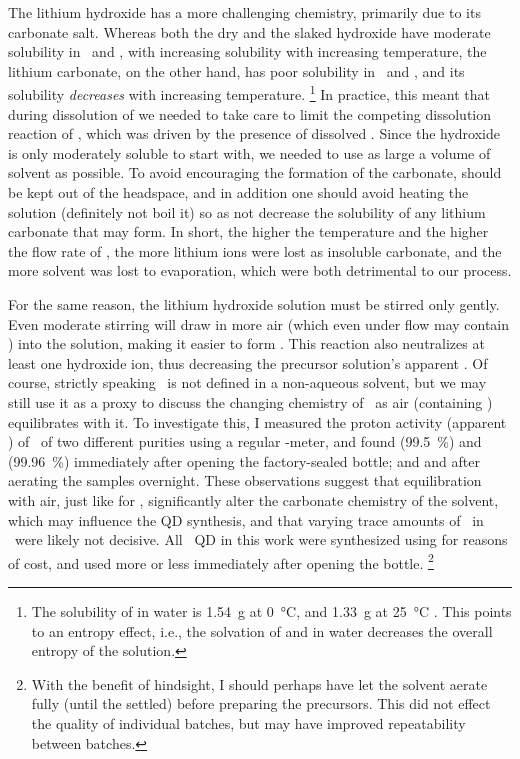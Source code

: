 \documentclass[draft,webedition,openright,titles,swedish,english]{LuaUUThesis}\usepackage[]{graphicx}\usepackage[]{xcolor}
\newcommand{\ie}{i.e.}
\begin{document}
The lithium hydroxide  has a more
challenging chemistry, primarily due to its carbonate salt.
Whereas both the dry and the slaked hydroxide have moderate solubility in \water\ and \EtOH,
with increasing solubility with increasing temperature, the
lithium carbonate, on the other hand, has poor solubility in \water\ and \EtOH,
and its solubility \emph{decreases} with increasing temperature.%
\footnote{%
   The solubility of  in water is \qty{1.54}{\gram} at \qty{0}{\celsius},
   and \qty{1.33}{\gram} at \qty{25}{\celsius} \cite{CRC104}.
   This points to an entropy effect, \ie, the solvation of  and 
   in water decreases the overall entropy of the solution.}
In practice, this meant that during dissolution of
 we needed
to take care to limit the competing dissolution reaction of , which was
driven by the presence of dissolved .
Since the hydroxide is only moderately soluble to start with, we needed to use
as large a volume of solvent as possible. To avoid encouraging the formation
of the carbonate,  should be kept out of the headspace, and in addition
one should avoid heating the solution (definitely not boil it) so as not decrease
the solubility of any lithium carbonate that may form.
In short, the higher the temperature and the higher the flow rate of ,
the more lithium ions were lost as insoluble carbonate, and
the more solvent was lost to evaporation, which were both detrimental to our process.

For the same reason, the lithium hydroxide solution  must be stirred only gently.
Even moderate stirring will draw in more air (which even under  flow may contain
) into the solution, making it easier to form .
This reaction also neutralizes at least one hydroxide ion, thus decreasing the
precursor solution's apparent \pH.
Of course, strictly speaking \pH\ is not defined in a non-aqueous solvent,
but we may still use it as a proxy to discuss the changing chemistry of \EtOH\ as
air (containing \carbondiox) equilibrates with it.
To investigate this, I measured the proton activity (apparent \pH) of \EtOH\ of
two different purities using a regular \pH-meter,
and found  (\qty{99.5}{\percent}) and  (\qty{99.96}{\percent})
immediately after opening the factory-sealed bottle;
and  and  after aerating the samples overnight.
These observations suggest that equilibration with air, just like for \water, significantly
alter the carbonate chemistry of the solvent, which may influence the \gls{QD} synthesis,
and that varying trace amounts of \water\ in \EtOH\ were likely not decisive.
All \ZnO\ \gls{QD} in this work were synthesized using 
for reasons of cost, and used more or less immediately after opening the bottle.%
\footnote{%
   With the benefit of hindsight, I should perhaps have let the 
   solvent aerate fully (until the \pH{} settled) before preparing the precursors.
   This did not effect the quality of individual batches, but may have improved
   repeatability between batches.}
\end{document}
